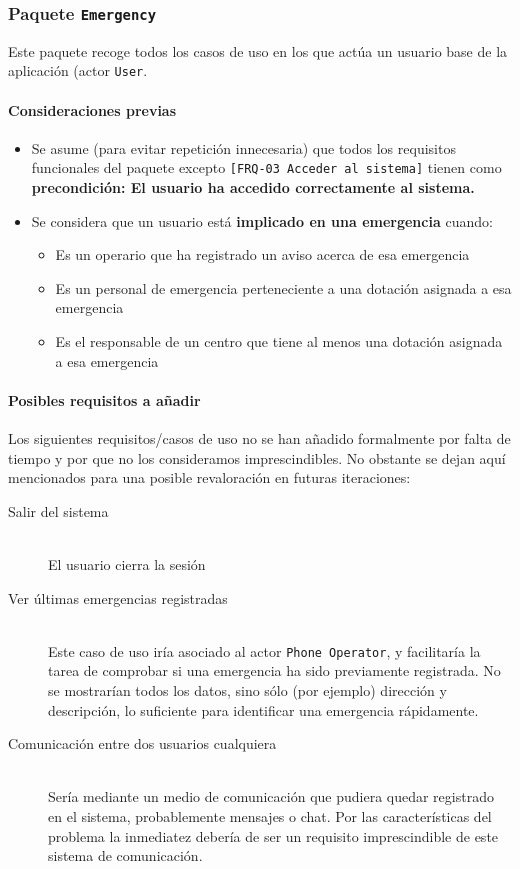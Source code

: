 \subsubsection{Paquete \texttt{Emergency}}

Este paquete recoge todos los casos de uso en los que actúa un usuario base de la aplicación (actor \texttt{User}.
\par

\paragraph{Consideraciones previas}
\begin{itemize}
    \item{Se asume (para evitar repetición innecesaria) que todos los requisitos funcionales del paquete excepto \texttt{[FRQ-03 Acceder al sistema]} tienen como \textbf{precondición: El usuario ha accedido correctamente al sistema.}}
    \item{Se considera que un usuario está \textbf{implicado en una emergencia} cuando:
        \begin{itemize}
            \item{Es un operario que ha registrado un aviso acerca de esa emergencia}
            \item{Es un personal de emergencia perteneciente a una dotación asignada a esa emergencia}
            \item{Es el responsable de un centro que tiene al menos una dotación asignada a esa emergencia}
        \end{itemize}
    }
\end{itemize}

\paragraph{Posibles requisitos a añadir}

Los siguientes requisitos/casos de uso no se han añadido formalmente por falta de tiempo y por que no los consideramos imprescindibles. No obstante se dejan aquí mencionados para una posible revaloración en futuras iteraciones:
\begin{description}
    \item[Salir del sistema] \hfill \\
        El usuario cierra la sesión
    \item[Ver últimas emergencias registradas] \hfill \\
        Este caso de uso iría asociado al actor \texttt{Phone Operator}, y facilitaría la tarea de comprobar si una emergencia ha sido previamente registrada. No se mostrarían todos los datos, sino sólo (por ejemplo) dirección y descripción, lo suficiente para identificar una emergencia rápidamente.
    \item[Comunicación entre dos usuarios cualquiera] \hfill \\
        Sería mediante un medio de comunicación que pudiera quedar registrado en el sistema, probablemente mensajes o chat. Por las características del problema la inmediatez debería de ser un requisito imprescindible de este sistema de comunicación.
\end{description}

